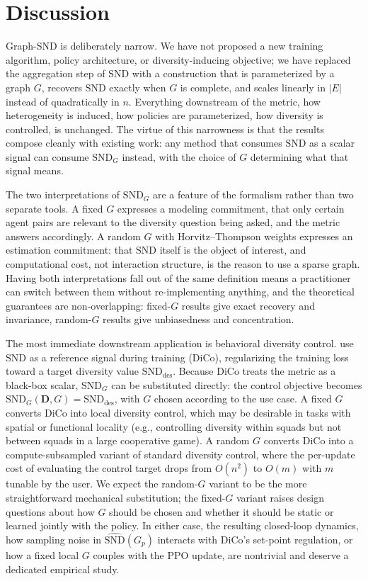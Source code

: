 \documentclass[11pt]{article}
\theoremstyle{plain}
\theoremstyle{definition}
\theoremstyle{remark}
\newcommand{\SND}{\ensuremath{\mathrm{SND}}}
\newcommand{\SNDG}{\mathrm{SND}_{G}}
\begin{document}
\section{Discussion}
\label{sec:discussion}

Graph-SND is deliberately narrow. We have not proposed a new training
algorithm, policy architecture, or diversity-inducing objective; we
have replaced the aggregation step of $\SND$ with a construction that
is parameterized by a graph $G$, recovers $\SND$ exactly when $G$ is
complete, and scales linearly in $|E|$ instead of quadratically in
$n$. Everything downstream of the metric, how heterogeneity is
induced, how policies are parameterized, how diversity is controlled, is unchanged. The virtue of this narrowness is that the results
compose cleanly with existing work: any method that consumes $\SND$ as
a scalar signal can consume $\SNDG$ instead, with the choice of $G$
determining what that signal means.

The two interpretations of $\SNDG$ are a feature of the formalism
rather than two separate tools. A fixed $G$ expresses a modeling
commitment, that only certain agent pairs are relevant to the
diversity question being asked, and the metric answers accordingly.
A random $G$ with Horvitz--Thompson weights expresses an estimation
commitment: that $\SND$ itself is the object of interest, and
computational cost, not interaction structure, is the reason to use a
sparse graph. Having both interpretations fall out of the same
definition means a practitioner can switch between them without
re-implementing anything, and the theoretical guarantees are
non-overlapping: fixed-$G$ results give exact recovery and invariance,
random-$G$ results give unbiasedness and concentration.

The most immediate downstream application is behavioral diversity
control. \citet{bettini2024dico} use $\SND$ as a reference signal
during training (DiCo), regularizing the training loss toward a
target diversity value $\SND_{\mathrm{des}}$. Because DiCo treats the
metric as a black-box scalar, $\SNDG$ can be substituted directly:
the control objective becomes $\SNDG(\mathbf{D}, G) =
\SND_{\mathrm{des}}$, with $G$ chosen according to the use case. A
fixed $G$ converts DiCo into local diversity control, which may be
desirable in tasks with spatial or functional locality (e.g.,
controlling diversity within squads but not between squads in a
large cooperative game). A random $G$ converts DiCo into a
compute-subsampled variant of standard diversity control, where the
per-update cost of evaluating the control target drops from
$O(n^2)$ to $O(m)$ with $m$ tunable by the user. We expect the random-$G$ variant to be the more straightforward mechanical
substitution; the fixed-$G$ variant raises design questions about how $G$
should be chosen and whether it should be static or learned jointly with
the policy. In either case, the resulting closed-loop dynamics, how
sampling noise in $\widehat{\SND}(G_p)$ interacts with DiCo's set-point
regulation, or how a fixed local $G$ couples with the PPO update, are
nontrivial and deserve a dedicated empirical study.
\end{document}
